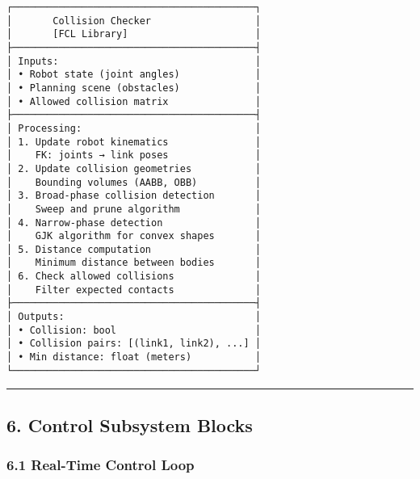 \documentclass[
]{article}
\begin{document}
\begin{verbatim}
┌──────────────────────────────────────────┐
│       Collision Checker                  │
│       [FCL Library]                      │
├──────────────────────────────────────────┤
│ Inputs:                                  │
│ • Robot state (joint angles)             │
│ • Planning scene (obstacles)             │
│ • Allowed collision matrix               │
├──────────────────────────────────────────┤
│ Processing:                              │
│ 1. Update robot kinematics               │
│    FK: joints → link poses               │
│ 2. Update collision geometries           │
│    Bounding volumes (AABB, OBB)          │
│ 3. Broad-phase collision detection       │
│    Sweep and prune algorithm             │
│ 4. Narrow-phase detection                │
│    GJK algorithm for convex shapes       │
│ 5. Distance computation                  │
│    Minimum distance between bodies       │
│ 6. Check allowed collisions              │
│    Filter expected contacts              │
├──────────────────────────────────────────┤
│ Outputs:                                 │
│ • Collision: bool                        │
│ • Collision pairs: [(link1, link2), ...] │
│ • Min distance: float (meters)           │
└──────────────────────────────────────────┘
\end{verbatim}

\begin{center}\rule{0.5\linewidth}{0.5pt}\end{center}

\hypertarget{control-subsystem-blocks}{%
\subsection{6. Control Subsystem
Blocks}\label{control-subsystem-blocks}}

\hypertarget{real-time-control-loop}{%
\subsubsection{6.1 Real-Time Control
Loop}\label{real-time-control-loop}}
\end{document}
